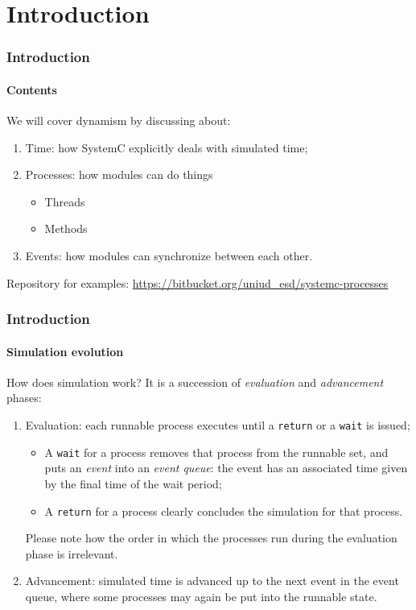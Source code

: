 \section{Introduction}

\begin{frame}
\frametitle{Introduction}
\framesubtitle{Contents}
\begin{block}{We will cover dynamism by discussing about:}
\begin{enumerate}
\item Time: how SystemC explicitly deals with simulated time;
\item Processes: how modules can do things
\begin{itemize}
\item Threads
\item Methods
\end{itemize}
\item Events: how modules can synchronize between each other.
\end{enumerate}
\end{block}
\pause
\begin{block}{Repository for examples:}
\url{https://bitbucket.org/uniud_esd/systemc-processes}
\end{block}
\end{frame}

\begin{frame}
\frametitle{Introduction}
\framesubtitle{Simulation evolution}

\begin{block}{How does simulation work?}
It is a succession of {\em evaluation} and {\em advancement} phases:
\begin{enumerate}
\item Evaluation: each runnable process executes until a \texttt{return} or a \texttt{wait} is issued;
\begin{itemize}
\item A \texttt{wait} for a process removes that process from the runnable set, and puts an {\em event} into an {\em event queue}: the event has an associated time given by the final time of the wait period;
\item A \texttt{return} for a process clearly concludes the simulation for that process.
\end{itemize}
Please note how the order in which the processes run during the evaluation phase is irrelevant.
\pause
\item Advancement: simulated time is advanced up to the next event in the event queue, where some processes may again be put into the runnable state.
\end{enumerate}
\end{block}

\end{frame}

